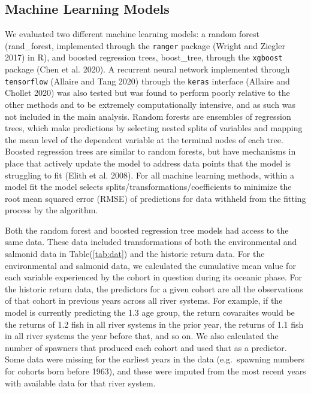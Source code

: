 \documentclass[
]{article}
\begin{document}
\hypertarget{machine-learning-models}{%
\subsection{Machine Learning Models}\label{machine-learning-models}}

We evaluated two different machine learning models: a random forest (rand\_forest, implemented through the \texttt{ranger} package (Wright and Ziegler 2017) in R), and boosted regression trees, boost\_tree, through the \texttt{xgboost} package (Chen et al. 2020). A recurrent neural network implemented through \texttt{tensorflow} (Allaire and Tang 2020) through the \texttt{keras} interface (Allaire and Chollet 2020) was also tested but was found to perform poorly relative to the other methods and to be extremely computationally intensive, and as such was not included in the main analysis. Random forests are ensembles of regression trees, which make predictions by selecting nested splits of variables and mapping the mean level of the dependent variable at the terminal nodes of each tree. Boosted regression trees are similar to random forests, but have mechanisms in place that actively update the model to address data points that the model is struggling to fit (Elith et al. 2008). For all machine learning methods, within a model fit the model selects splits/transformations/coefficients to minimize the root mean squared error (RMSE) of predictions for data withheld from the fitting process by the algorithm.

Both the random forest and boosted regression tree models had access to the same data. These data included transformations of both the environmental and salmonid data in Table(\ref{tab:dat}) and the historic return data. For the environmental and salmonid data, we calculated the cumulative mean value for each variable experienced by the cohort in question during its oceanic phase. For the historic return data, the predictors for a given cohort are all the observations of that cohort in previous years across all river systems. For example, if the model is currently predicting the 1.3 age group, the return covaraites would be the returns of 1.2 fish in all river systems in the prior year, the returns of 1.1 fish in all river systems the year before that, and so on. We also calculated the number of spawners that produced each cohort and used that as a predictor. Some data were missing for the earliest years in the data (e.g.~spawning numbers for cohorts born before 1963), and these were imputed from the most recent years with available data for that river system.
\end{document}
